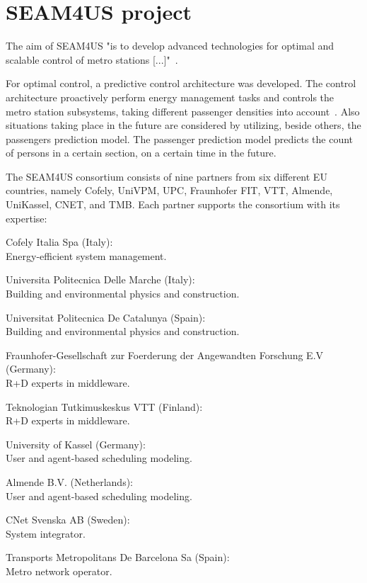 
\section{SEAM4US project}
\label{sec:seam4us}

The aim of SEAM4US "is to develop advanced technologies for optimal and scalable control of metro stations [...]"~\cite{SEAM4US_Website}.

For optimal control, a predictive control architecture was developed. The control architecture proactively perform energy management tasks and controls the metro station subsystems, taking different passenger densities into account~\cite{ansuini_models_2013}. Also situations taking place in the future are considered by utilizing, beside others, the passengers prediction model. The passenger prediction model predicts the count of persons in a certain section, on a certain time in the future.

The SEAM4US consortium consists of nine partners from six different EU countries, namely Cofely, UniVPM, UPC, Fraunhofer FIT, VTT, Almende, UniKassel, CNET, and TMB. Each partner supports the consortium with its expertise:

\begin{description}\setlength{\itemsep}{-2pt}
  \item[Cofely] Cofely Italia Spa (Italy):\\Energy-efficient system management.
  \item[UniVPM] Universita Politecnica Delle Marche (Italy):\\Building and environmental physics and construction.
  \item[UPC] Universitat Politecnica De Catalunya (Spain):\\Building and environmental physics and construction.
  \item[Fraunhofer~FIT] Fraunhofer-Gesellschaft zur Foerderung der Angewandten Forschung E.V (Germany):\\R+D experts in middleware.
  \item[VTT] Teknologian Tutkimuskeskus VTT (Finland):\\R+D experts in middleware.
  \item[UniKassel] University of Kassel (Germany):\\User and agent-based scheduling modeling.
  \item[Almende] Almende B.V. (Netherlands):\\User and agent-based scheduling modeling.
  \item[CNet] CNet Svenska AB (Sweden):\\System integrator.
  \item[TMB] Transports Metropolitans De Barcelona Sa (Spain):\\Metro network operator.
\end{description}

